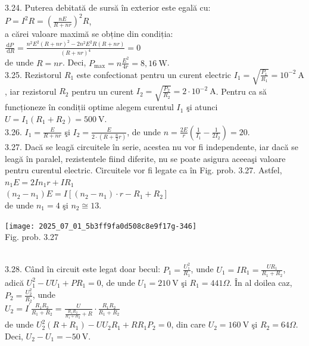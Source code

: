 3.24. Puterea debitată de sursă în exterior este egală cu:\\ $P=I^{2} R=\left(\frac{n E}{R+n r}\right)^{2} R$,\\ a cărei valoare maximă se obține din condiția:\\ $\frac{\mathrm{d} P}{\mathrm{~d} R}=\frac{n^{2} E^{2}(R+n r)^{2}-2 n^{2} E^{2} R(R+n r)}{(R+n r)^{4}}=0$\\ de unde $R=n r$. Deci, $P_{\max }=n \frac{E^{2}}{4 r}=8,16 \mathrm{~W}$.\\

3.25. Rezistorul $R_{1}$ este confectionat pentru un curent electric $I_{1}=\sqrt{\frac{P_{1}}{R_{1}}}=10^{-2} \mathrm{~A}$, iar rezistorul $R_{2}$ pentru un curent $I_{2}=\sqrt{\frac{P_{2}}{R_{2}}}=2 \cdot 10^{-2} \mathrm{~A}$. Pentru ca să funcționeze în condiții optime alegem curentul $I_{1}$ şi atunci $U=I_{1}\left(R_{1}+R_{2}\right)=500 \mathrm{~V}$.\\

3.26. $I_{1}=\frac{E}{R+n r}$ şi $I_{2}=\frac{E}{2 \cdot\left(R+\frac{n}{2} r\right)}$, de unde $n=\frac{2 E}{r}\left(\frac{1}{I_{1}}-\frac{1}{2 I_{2}}\right)=20$.\\

3.27. Dacă se leagă circuitele în serie, acestea nu vor fi independente, iar dacă se leagă în paralel, rezistentele fiind diferite, nu se poate asigura aceeaşi valoare pentru curentul electric. Circuitele vor fi legate ca în Fig. prob. 3.27. Astfel,\\ $n_{1} E=2 I n_{1} r+I R_{1}$\\ $\left(n_{2}-n_{1}\right) E=I\left[\left(n_{2}-n_{1}\right) \cdot r-R_{1}+R_{2}\right]$\\ de unde $n_{1}=4$ şi $n_{2} \cong 13$.\\ \begin{center} \texttt{[image: 2025\_07\_01\_5b3ff9fa0d508c8e9f17g-346]}\\ Fig. prob. 3.27 \end{center}\\

3.28. Când în circuit este legat doar becul: $P_{1}=\frac{U_{1}^{2}}{R_{1}}$, unde $U_{1}=I R_{1}=\frac{U R_{1}}{R_{1}+R_{2}}$, adică $U_{1}^{2}-U U_{1}+P R_{1}=0$, de unde $U_{1}=210 \mathrm{~V}$ şi $R_{1}=441 \Omega$. În al doilea caz, $P_{2}=\frac{U_{2}^{2}}{R_{2}}$, unde\\ $U_{2}=I^{\prime} \frac{R_{1} R_{2}}{R_{1}+R_{2}}=\frac{U}{\frac{R_{1} R_{2}}{R_{1}+R_{2}}+R} \cdot \frac{R_{1} R_{2}}{R_{1}+R_{2}}$\\ de unde $U_{2}^{2}\left(R+R_{1}\right)-U U_{2} R_{1}+R R_{1} P_{2}=0$, din care $U_{2}=160 \mathrm{~V}$ şi $R_{2}=64 \Omega$. Deci, $U_{2}-U_{1}=-50 \mathrm{~V}$.\\

